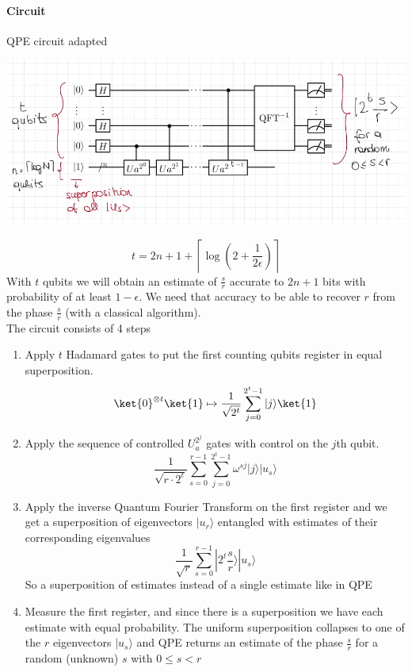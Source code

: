 \documentclass[10pt]{report}
\begin{document}
\paragraph{Circuit} QPE circuit adapted\begin{center}
	\includegraphics[scale=0.5]{39.png}
\end{center}
$$ t= 2n+1+\left\lceil\log\left(2+\frac{1}{2\epsilon}\right)\right\rceil$$
With $t$ qubits we will obtain an estimate of $\frac{s}{r}$ accurate to $2n+1$ bits with probability of at least $1-\epsilon$. We need that accuracy to be able to recover $r$ from the phase $\frac{s}{r}$ (with a classical algorithm).\\
The circuit consists of 4 steps
\begin{enumerate}
	\item Apply $t$ Hadamard gates to put the first counting qubits register in equal superposition.
	$$\ket{0}^{\otimes t}\ket{1}\mapsto \frac{1}{\sqrt{2^t}}\sum_{j=0}^{2^t-1}|j\rangle\ket{1}$$
	\item Apply the sequence of controlled $U_a^{2^j}$ gates with control on the $j$th qubit.
	$$\frac{1}{\sqrt{r\cdot2^t}}\sum_{s=0}^{r-1}\sum_{j=0}^{2^t-1}\omega^{sj}|j\rangle|u_s\rangle$$
	\item Apply the inverse Quantum Fourier Transform on the first register and we get a superposition of eigenvectors $|u_r\rangle$ entangled with estimates of their corresponding eigenvalues
	$$\frac{1}{\sqrt{r}}\sum_{s=0}^{r-1}|2^t\frac{s}{r}\rangle|u_s\rangle $$
	So a superposition of estimates instead of a single estimate like in QPE
	\item Measure the first register, and since there is a superposition we have each estimate with equal probability. The uniform superposition collapses to one of the $r$ eigenvectors $|u_s\rangle$ and QPE returns an estimate of the phase $\frac{s}{r}$ for a random (unknown) $s$ with $0\leq s< r$
\end{enumerate}
\end{document}
